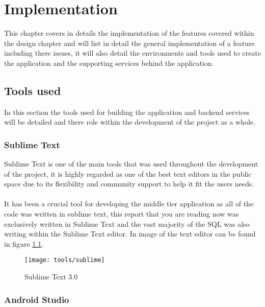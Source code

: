 \chapter{Implementation}

This chapter covers in details the implementation of the features covered within the design chapter and will list in detail the general implementation of a feature including there issues, it will also detail the environments and tools used to create the application and the supporting services behind the application.

\section{Tools used}

In this section the tools used for building the application and backend services will be detailed and there role within the development of the project as a whole.

\subsection*{Sublime Text}

Sublime Text is one of the main tools that was used throughout the development of the project, it is highly regarded as one of the best text editors in the public space due to its flexibility and community support to help it fit the users needs.\\
\\
It has been a crucial tool for developing the middle tier application as all of the code was written in sublime text, this report that you are reading now was exclusively written in Sublime Text and the vast majority of the SQL was also writing within the Sublime Text editor. In image of the text editor can be found in figure \ref{fig:sublime_text_image}.

\begin{figure}[H]
    \centering
    \texttt{[image: tools/sublime]}
    \caption{Sublime Text 3.0}
    \label{fig:sublime_text_image}
\end{figure} 

\subsection*{Android Studio}

